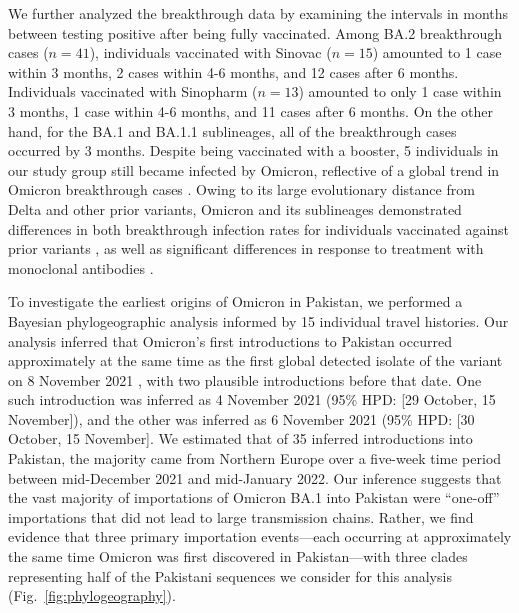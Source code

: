 
We further analyzed the breakthrough data by examining the intervals in months between testing positive after being fully vaccinated.
Among BA.2 breakthrough cases ($n=41$), individuals vaccinated with Sinovac ($n=15$) amounted to 1 case within 3 months, 2 cases within 4-6 months, and 12 cases after 6 months.
Individuals vaccinated with Sinopharm ($n=13$) amounted to only 1 case within 3 months, 1 case within 4-6 months, and 11 cases after 6 months.
On the other hand, for the BA.1 and BA.1.1 sublineages, all of the breakthrough cases occurred by 3 months.
Despite being vaccinated with a booster, 5 individuals in our study group still became infected by Omicron, reflective of a global trend in Omicron breakthrough cases \cite{goga2022breakthrough}.
Owing to its large evolutionary distance from Delta and other prior variants, Omicron and its sublineages demonstrated differences in both breakthrough infection rates for individuals vaccinated against prior variants \cite{safdar2023waning}, as well as significant differences in response to treatment with monoclonal antibodies \cite{bruel2022serum}.

To investigate the earliest origins of Omicron in Pakistan, we performed a Bayesian phylogeographic analysis informed by 15 individual travel histories.
Our analysis inferred that Omicron's first introductions to Pakistan occurred approximately at the same time as the first global detected isolate of the variant on 8 November 2021 \cite{dyer2021covid}, with two plausible introductions before that date.
One such introduction was inferred as 4 November 2021 (95\% HPD: [29 October, 15 November]), and the other was inferred as 6 November 2021 (95\% HPD: [30 October, 15 November].
We estimated that of 35 inferred introductions into Pakistan, the majority came from Northern Europe over a five-week time period between mid-December 2021 and mid-January 2022.
Our inference suggests that the vast majority of importations of Omicron BA.1 into Pakistan were ``one-off'' importations that did not lead to large transmission chains.
Rather, we find evidence that three primary importation events---each occurring at approximately the same time Omicron was first discovered in Pakistan---with three clades representing half of the Pakistani sequences we consider for this analysis (Fig.~\ref{fig:phylogeography}).

